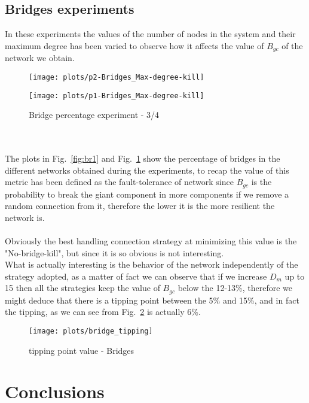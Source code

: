 \documentclass{llncs}
\begin{document}
\subsection{Bridges experiments}
In these experiments the values of the number of nodes in the system and their maximum degree has been varied to observe how it affects the value of $B_{gc}$ of the network we obtain.
\begin{figure}[h!]
	\begin{minipage}{0.5\textwidth}
		\texttt{[image: plots/p2-Bridges\_Max-degree-kill]}
		\caption{Bridge percentage - 1/2}
		\label{fig:br1}
	\end{minipage}\hfill
	\begin{minipage}{0.5\textwidth}
		\centering
		\texttt{[image: plots/p1-Bridges\_Max-degree-kill]}
		\caption{Bridge percentage experiment - 3/4}
		\label{fig:br2}
	\end{minipage}
\end{figure}
%
\\\\
The plots in Fig.~\ref{fig:br1} and Fig.~\ref{fig:br2} show the percentage of bridges in the different networks obtained during the experiments, to recap the value of this metric has been defined as the fault-tolerance of network since $B_{gc}$ is the probability to break the giant component in more components if we remove a random connection from it, therefore the lower it is the more resilient the network is.
\\\\
Obviously the best handling connection strategy at minimizing this value is the "No-bridge-kill", but since it is so obvious is not interesting.\\
What is actually interesting is the behavior of the network independently of the strategy adopted, as a matter of fact we can observe that if we increase $D_{m}$ up to 15 then all the strategies keep the value of $B_{gc}$ below the 12-13\%, therefore we might deduce that there is a tipping point between the 5\% and 15\%, and in fact the tipping, as we can see from Fig.~\ref{fig:tip1} is actually 6\%.
\begin{figure}[h!]
	\texttt{[image: plots/bridge\_tipping]}
	\caption{tipping point value - Bridges}
	\label{fig:tip1}
\end{figure}
\section{Conclusions} 
%
\begin{thebibliography}{}
	
\end{thebibliography}
\end{document}
